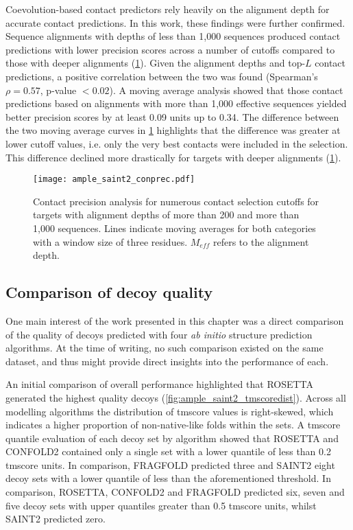 Coevolution-based contact predictors rely heavily on the alignment depth for accurate contact predictions. In this work, these findings were further confirmed. Sequence alignments with depths of less than 1,000 sequences produced contact predictions with lower precision scores across a number of cutoffs compared to those with deeper alignments (\cref{fig:ample_saint2_conprec}). Given the alignment depths and top-$L$ contact predictions, a positive correlation between the two was found (Spearman's $\rho=0.57$, p-value $<0.02$). A moving average analysis showed that those contact predictions based on alignments with more than 1,000 effective sequences yielded better precision scores by at least 0.09 units up to 0.34. The difference between the two moving average curves in \cref{fig:ample_saint2_conprec} highlights that the difference was greater at lower cutoff values, i.e. only the very best contacts were included in the selection. This difference declined more drastically for targets with deeper alignments (\cref{fig:ample_saint2_conprec}).

\begin{figure}[H]
    \centering
    \texttt{[image: ample\_saint2\_conprec.pdf]}
    \caption[Contact predicion analysis for numerous contact selection cutoffs]{Contact precision analysis for numerous contact selection cutoffs for targets with alignment depths of more than 200 and more than 1,000 sequences. Lines indicate moving averages for both categories with a window size of three residues. $M_{eff}$ refers to the alignment depth.}
    \label{fig:ample_saint2_conprec}
\end{figure}

\subsection{Comparison of decoy quality}
One main interest of the work presented in this chapter was a direct comparison of the quality of decoys predicted with four \textit{ab initio} structure prediction algorithms. At the time of writing, no such comparison existed on the same dataset, and thus might provide direct insights into the performance of each.

An initial comparison of overall performance highlighted that ROSETTA generated the highest quality decoys (\cref{fig:ample_saint2_tmscoredist}). Across all modelling algorithms the distribution of \gls{tmscore} values is right-skewed, which indicates a higher proportion of non-native-like folds within the sets. A \gls{tmscore} quantile evaluation of each decoy set by algorithm showed that ROSETTA and CONFOLD2 contained only a single set with a lower quantile of less than 0.2 \gls{tmscore} units. In comparison, FRAGFOLD predicted three and SAINT2 eight decoy sets with a lower quantile of less than the aforementioned threshold. In comparison, ROSETTA, CONFOLD2 and FRAGFOLD predicted six, seven and five decoy sets with upper quantiles greater than 0.5 \gls{tmscore} units, whilst SAINT2 predicted zero.

